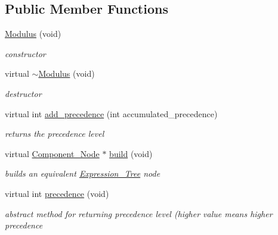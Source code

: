 \subsection*{Public Member Functions}
\begin{DoxyCompactItemize}
\item 
\hyperlink{classMadara_1_1Expression__Tree_1_1Modulus_a122584d3d691ae0d691fa2d93da87400}{Modulus} (void)
\begin{DoxyCompactList}\small\item\em constructor \item\end{DoxyCompactList}\item 
virtual \hyperlink{classMadara_1_1Expression__Tree_1_1Modulus_a081bde9e7546be6f38dd3cfd059bc015}{$\sim$Modulus} (void)
\begin{DoxyCompactList}\small\item\em destructor \item\end{DoxyCompactList}\item 
virtual int \hyperlink{classMadara_1_1Expression__Tree_1_1Modulus_a147ac7e07cbcd35f65053d0e8a438455}{add\_\-precedence} (int accumulated\_\-precedence)
\begin{DoxyCompactList}\small\item\em returns the precedence level \item\end{DoxyCompactList}\item 
virtual \hyperlink{classMadara_1_1Expression__Tree_1_1Component__Node}{Component\_\-Node} $\ast$ \hyperlink{classMadara_1_1Expression__Tree_1_1Modulus_abbc5497a24254b85ceb13c12e4c6367a}{build} (void)
\begin{DoxyCompactList}\small\item\em builds an equivalent \hyperlink{classMadara_1_1Expression__Tree_1_1Expression__Tree}{Expression\_\-Tree} node \item\end{DoxyCompactList}\item 
virtual int \hyperlink{classMadara_1_1Expression__Tree_1_1Symbol_ac060dedb8d16864591b259df375109b3}{precedence} (void)
\begin{DoxyCompactList}\small\item\em abstract method for returning precedence level (higher value means higher precedence \item\end{DoxyCompactList}\end{DoxyCompactItemize}
